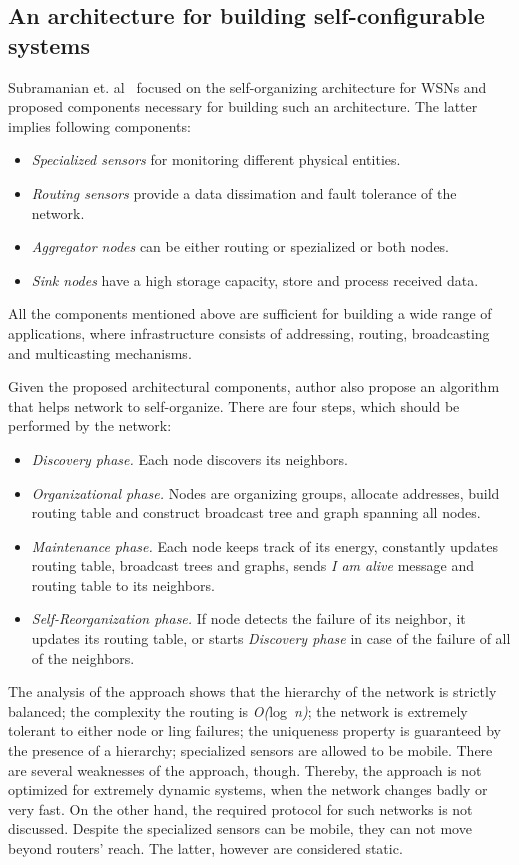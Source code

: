 \subsection{An architecture for building self-configurable systems}

Subramanian et. al~\cite{subramanian00} focused on the self-organizing architecture for WSNs and
proposed components necessary for building such an architecture. The latter
implies following components:

\begin{itemize}
\item \emph{Specialized sensors} for monitoring different physical entities.
\item \emph{Routing sensors} provide a data dissimation and fault tolerance of the network.
\item \emph{Aggregator nodes} can be either routing or spezialized or both nodes.
\item \emph{Sink nodes} have a high storage capacity, store and process received data.
\end{itemize}
All the components mentioned above are sufficient for building a wide range of
applications, where infrastructure consists of addressing, routing, broadcasting
and multicasting mechanisms.

Given the proposed architectural components, author also propose an algorithm
that helps network to self-organize. There are four steps, which should be
performed by the network:

\begin{itemize}
\item \emph{Discovery phase.} Each node discovers its neighbors.
\item \emph{Organizational phase.} Nodes are organizing groups, allocate
addresses, build routing table and construct broadcast tree and graph spanning
all nodes.
\item \emph{Maintenance phase.} Each node keeps track of its energy, constantly
updates routing table, broadcast trees and graphs, sends \emph{I am alive}
message and routing table to its neighbors.
\item \emph{Self-Reorganization phase.} If node detects the failure of its
neighbor, it updates its routing table, or starts \emph{Discovery phase} in case
of the failure of all of the neighbors.
\end{itemize}

The analysis of the approach shows that the hierarchy of the network is strictly
balanced; the complexity the routing is \emph{O(}log~\emph{n)}; the network is
extremely tolerant to either node or ling failures; the uniqueness property is
guaranteed by the presence of a hierarchy; specialized sensors are allowed to be
mobile. There are several weaknesses of the approach, though. Thereby,
the approach is not optimized for extremely dynamic systems, when the network
changes badly or very fast. On the other hand, the required protocol for such
networks is not discussed. Despite the specialized sensors can be mobile, they
can not move beyond routers' reach. The latter, however are considered static.